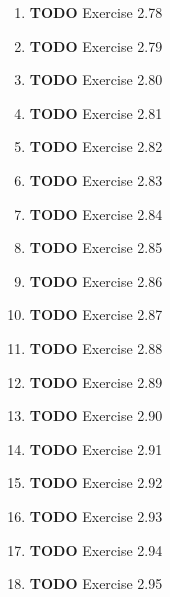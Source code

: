 \documentclass[11pt]{article}
\begin{document}
\begin{enumerate}
\begin{enumerate}
\item {\bfseries\sffamily TODO} Exercise 2.78
\label{sec:orgb2f9570}

\item {\bfseries\sffamily TODO} Exercise 2.79
\label{sec:org9761024}

\item {\bfseries\sffamily TODO} Exercise 2.80
\label{sec:orgd93bf71}

\item {\bfseries\sffamily TODO} Exercise 2.81
\label{sec:org8840447}

\item {\bfseries\sffamily TODO} Exercise 2.82
\label{sec:org002abc4}

\item {\bfseries\sffamily TODO} Exercise 2.83
\label{sec:orge303c61}

\item {\bfseries\sffamily TODO} Exercise 2.84
\label{sec:orgc0e910b}

\item {\bfseries\sffamily TODO} Exercise 2.85
\label{sec:orge0938f6}

\item {\bfseries\sffamily TODO} Exercise 2.86
\label{sec:orge7e50d4}

\item {\bfseries\sffamily TODO} Exercise 2.87
\label{sec:orgab32e66}

\item {\bfseries\sffamily TODO} Exercise 2.88
\label{sec:org996d365}

\item {\bfseries\sffamily TODO} Exercise 2.89
\label{sec:orgc9dc467}

\item {\bfseries\sffamily TODO} Exercise 2.90
\label{sec:org81944a9}

\item {\bfseries\sffamily TODO} Exercise 2.91
\label{sec:org05e866a}

\item {\bfseries\sffamily TODO} Exercise 2.92
\label{sec:org314c331}

\item {\bfseries\sffamily TODO} Exercise 2.93
\label{sec:orga57af07}

\item {\bfseries\sffamily TODO} Exercise 2.94
\label{sec:org5119958}

\item {\bfseries\sffamily TODO} Exercise 2.95
\label{sec:orgb2f0463}


\end{enumerate}
\end{enumerate}
\end{document}
